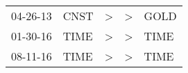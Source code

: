 \begin{supertabular}{lllll}
 04-26-13 &  CNST &  \textgreater &  \textgreater &  GOLD \\
 01-30-16 &  TIME &  \textgreater &  \textgreater &  TIME \\
 08-11-16 &  TIME &  \textgreater &  \textgreater &  TIME \\
\end{supertabular}
